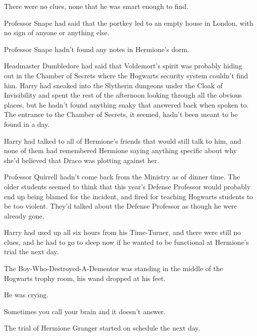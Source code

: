There were no clues, none that he was smart enough to find.

Professor Snape had said that the portkey led to an empty house in London, with no sign of anyone or anything else.

Professor Snape hadn't found any notes in Hermione's dorm.

Headmaster Dumbledore had said that Voldemort's spirit was probably hiding out in the Chamber of Secrets where the Hogwarts security system couldn't find him. Harry had sneaked into the Slytherin dungeons under the Cloak of Invisibility and spent the rest of the afternoon looking through all the obvious places, but he hadn't found anything snaky that answered back when spoken to. The entrance to the Chamber of Secrets, it seemed, hadn't been meant to be found in a day.

Harry had talked to all of Hermione's friends that would still talk to him, and none of them had remembered Hermione saying anything specific about why she'd believed that Draco was plotting against her.

Professor Quirrell hadn't come back from the Ministry as of dinner time. The older students seemed to think that this year's Defense Professor would probably end up being blamed for the incident, and fired for teaching Hogwarts students to be too violent. They'd talked about the Defense Professor as though he were already gone.

Harry had used up all six hours from his Time-Turner, and there were still no clues, and he had to go to sleep now if he wanted to be functional at Hermione's trial the next day.

The Boy-Who-Destroyed-A-Dementor was standing in the middle of the Hogwarts trophy room, his wand dropped at his feet.

He was crying.

Sometimes you call your brain and it doesn't answer.

The trial of Hermione Granger started on schedule the next day.

